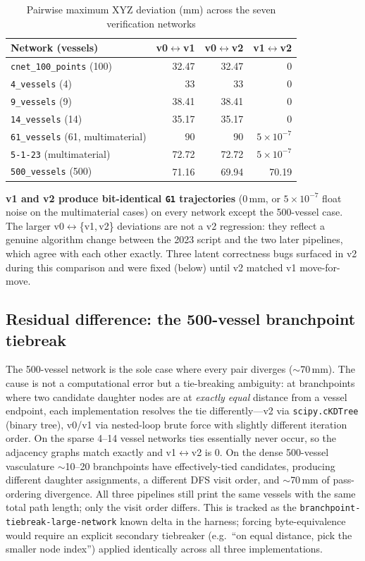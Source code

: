 \documentclass[11pt,a4paper]{article}
\begin{document}
\begin{table}[H]
\centering
\caption{Pairwise maximum XYZ deviation (mm) across the seven verification networks}
\begin{tabular}{lrrr}
\toprule
\textbf{Network (vessels)} & \textbf{v0$\leftrightarrow$v1} & \textbf{v0$\leftrightarrow$v2} & \textbf{v1$\leftrightarrow$v2} \\
\midrule
\texttt{cnet\_100\_points} (100)        & 32.47 & 32.47 & 0 \\
\texttt{4\_vessels} (4)                  & 33 & 33 & 0 \\
\texttt{9\_vessels} (9)                  & 38.41 & 38.41 & 0 \\
\texttt{14\_vessels} (14)                & 35.17 & 35.17 & 0 \\
\texttt{61\_vessels} (61, multimaterial) & 90 & 90 & $5\times10^{-7}$ \\
\texttt{5-1-23} (multimaterial)          & 72.72 & 72.72 & $5\times10^{-7}$ \\
\texttt{500\_vessels} (500)              & 71.16 & 69.94 & 70.19 \\
\bottomrule
\end{tabular}
\end{table}

\textbf{v1 and v2 produce bit-identical \texttt{G1} trajectories} (0\,mm, or
$5\times10^{-7}$ float noise on the multimaterial cases) on every network
except the 500-vessel case. The larger v0$\leftrightarrow$\{v1,\,v2\}
deviations are not a v2 regression: they reflect a genuine algorithm change
between the 2023 script and the two later pipelines, which agree with each
other exactly. Three latent correctness bugs surfaced in v2 during this
comparison and were fixed (below) until v2 matched v1 move-for-move.

\subsection{Residual difference: the 500-vessel branchpoint tiebreak}

The 500-vessel network is the sole case where every pair diverges
($\sim$70\,mm). The cause is not a computational error but a tie-breaking
ambiguity: at branchpoints where two candidate daughter nodes are at
\emph{exactly equal} distance from a vessel endpoint, each implementation
resolves the tie differently---v2 via \texttt{scipy.cKDTree} (binary tree),
v0/v1 via nested-loop brute force with slightly different iteration order.
On the sparse 4--14 vessel networks ties essentially never occur, so the
adjacency graphs match exactly and v1$\leftrightarrow$v2 is 0. On the dense
500-vessel vasculature $\sim$10--20 branchpoints have effectively-tied
candidates, producing different daughter assignments, a different DFS visit
order, and $\sim$70\,mm of pass-ordering divergence. All three pipelines
still print the same vessels with the same total path length; only the visit
order differs. This is tracked as the
\texttt{branchpoint-tiebreak-large-network} known delta in the harness;
forcing byte-equivalence would require an explicit secondary tiebreaker
(e.g.\ ``on equal distance, pick the smaller node index'') applied
identically across all three implementations.
\end{document}
